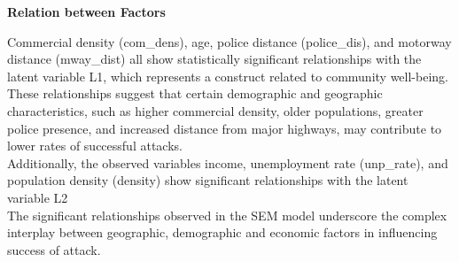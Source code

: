 \documentclass[10pt, conference, compsocconf]{IEEEtran}
\begin{document}
\textbf{Relation between Factors}

Commercial density (com\_dens), age, police distance (police\_dis), and motorway distance (mway\_dist) all show statistically significant relationships with the latent variable L1, which represents a construct related to community well-being. These relationships suggest that certain demographic and geographic characteristics, such as higher commercial density, older populations, greater police presence, and increased distance from major highways, may contribute to lower rates of successful attacks.\\
Additionally, the observed variables income, unemployment rate (unp\_rate), and population density (density) show significant relationships with the latent variable L2\\


The significant relationships observed in the SEM model underscore the complex interplay between geographic, demographic and economic factors in influencing success of attack. 
\end{document}
